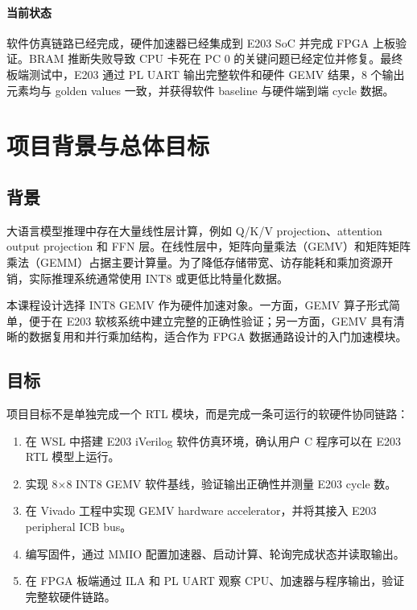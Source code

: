 \documentclass[12pt, a4paper]{article}
\begin{document}
\paragraph{当前状态}
软件仿真链路已经完成，硬件加速器已经集成到 E203 SoC 并完成 FPGA 上板验证。BRAM 推断失败导致 CPU 卡死在 PC 0 的关键问题已经定位并修复。最终板端测试中，E203 通过 PL UART 输出完整软件和硬件 GEMV 结果，8 个输出元素均与 golden values 一致，并获得软件 baseline 与硬件端到端 cycle 数据。

\section{项目背景与总体目标}

\subsection{背景}

大语言模型推理中存在大量线性层计算，例如 Q/K/V projection、attention output projection 和 FFN 层。在线性层中，矩阵向量乘法（GEMV）和矩阵矩阵乘法（GEMM）占据主要计算量。为了降低存储带宽、访存能耗和乘加资源开销，实际推理系统通常使用 INT8 或更低比特量化数据。

本课程设计选择 INT8 GEMV 作为硬件加速对象。一方面，GEMV 算子形式简单，便于在 E203 软核系统中建立完整的正确性验证；另一方面，GEMV 具有清晰的数据复用和并行乘加结构，适合作为 FPGA 数据通路设计的入门加速模块。

\subsection{目标}

项目目标不是单独完成一个 RTL 模块，而是完成一条可运行的软硬件协同链路：

\begin{enumerate}
    \item 在 WSL 中搭建 E203 iVerilog 软件仿真环境，确认用户 C 程序可以在 E203 RTL 模型上运行。
    \item 实现 8$\times$8 INT8 GEMV 软件基线，验证输出正确性并测量 E203 cycle 数。
    \item 在 Vivado 工程中实现 GEMV hardware accelerator，并将其接入 E203 peripheral ICB bus。
    \item 编写固件，通过 MMIO 配置加速器、启动计算、轮询完成状态并读取输出。
    \item 在 FPGA 板端通过 ILA 和 PL UART 观察 CPU、加速器与程序输出，验证完整软硬件链路。
\end{enumerate}
\end{document}
